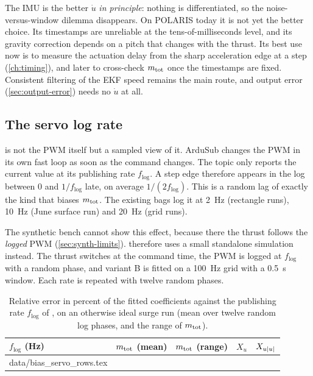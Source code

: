 \begin{keyidea}
The IMU is the better $\dot u$ \emph{in principle}: nothing is differentiated, so the
noise-versus-window dilemma disappears. On POLARIS today it is not yet the better choice.
Its timestamps are unreliable at the tens-of-milliseconds level, and its gravity correction
depends on a pitch that changes with the thrust. Its best use now is to measure the actuation
delay from the sharp acceleration edge at a step (\cref{ch:timing}), and later to cross-check
$m_\mathrm{tot}$ once the timestamps are fixed. Consistent filtering of the EKF speed remains the main
route, and output error (\cref{sec:output-error}) needs no $\dot u$ at all.
\end{keyidea}

\subsection{The servo log rate}

 is not the PWM itself but a sampled view of it. ArduSub changes the PWM
in its own fast loop as soon as the command changes. The topic only reports the current value
at its publishing rate $f_\mathrm{log}$. A step edge therefore appears in the log between $0$ and
$1/f_\mathrm{log}$ late, on average $1/(2f_\mathrm{log})$. This is a random lag of exactly the
kind that biases $m_\mathrm{tot}$. The existing bags log it at \qty{2}{\hertz} (rectangle runs),
\qty{10}{\hertz} (June surface run) and \qty{20}{\hertz} (grid runs).

The synthetic bench cannot show this effect, because there the thrust follows the
\emph{logged} PWM (\cref{sec:synth-limits}).  therefore uses a small
standalone simulation instead. The thrust switches at the command time, the PWM is logged at
$f_\mathrm{log}$ with a random phase, and variant B is fitted on a \qty{100}{\hertz} grid with a
\qty{0.5}{\second} window. Each rate is repeated with twelve random phases.

\begin{table}[htbp]
\centering
\caption{Relative error in percent of the fitted coefficients against the publishing rate
$f_\mathrm{log}$ of , on an otherwise ideal surge run (mean over twelve random
log phases, and the range of $m_\mathrm{tot}$).}
\label{tab:bias-servo}
\small
\begin{tabular}{@{}l c c c c@{}}
\toprule
$f_\mathrm{log}$ (\unit{\hertz}) & $m_\mathrm{tot}$ (mean) & $m_\mathrm{tot}$ (range) & $X_u$ & $X_{u|u|}$ \\
\midrule
{} data/bias_servo_rows.tex
\bottomrule
\end{tabular}
\end{table}
\FloatBarrier

